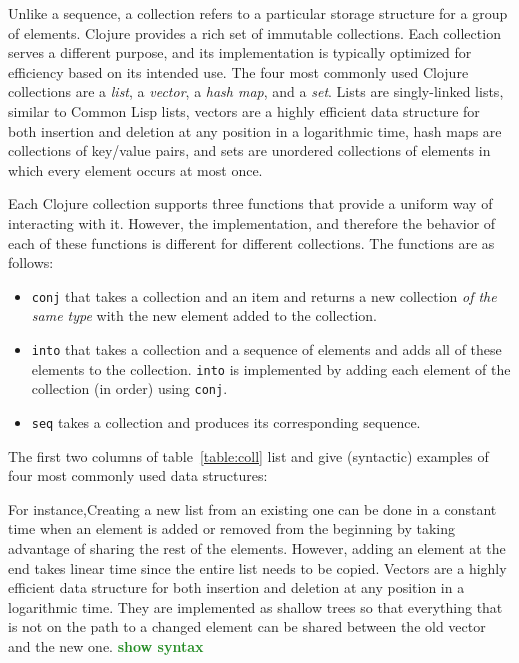 \documentclass[submission,copyright,creativecommons]{eptcs}
\newcommand{\allcomments}[1]{{#1}}
\newcommand{\elenacomment}[1]{{\bf \textcolor{ForestGreen}{\allcomments{{#1}}}}}
\newcommand{\clocode}[1]{{\tt {#1}}}
\begin{document}
Unlike a sequence, a collection refers to a particular storage structure for a group of elements. Clojure provides a rich set of immutable collections. Each collection serves a different purpose, and its  implementation  is typically optimized for efficiency based on its intended use. The four most commonly used Clojure collections are a {\it list}, a {\it vector}, a {\it hash map}, and a {\it set}. Lists are singly-linked lists, similar to Common Lisp lists, vectors are a highly efficient data structure for both insertion and deletion at any position in a logarithmic time, hash maps are collections of key/value pairs, and sets are unordered collections of elements in which every element occurs at most once. 

Each Clojure collection supports three functions that provide a uniform way of interacting with it. However, the implementation, and therefore the behavior of each of these functions is different for different collections. The functions are as follows:
\begin{itemize}
\item \clocode{conj} that takes a collection and an item and returns a new collection {\it of the same type} with the new element added to the collection. 
\item \clocode{into} that takes a collection and a sequence of elements and adds all of these elements to the collection. \clocode{into} is implemented by adding each element of the collection (in order) using \clocode{conj}. 
\item \clocode{seq} takes a collection and produces its corresponding sequence. 
\end{itemize}

The first two columns of table~\ref{table:coll} list and give (syntactic) examples of four most commonly used data structures:


For instance,Creating a new list from an existing one can be done in a constant time when an element is added or removed from the beginning by taking advantage of sharing the rest of the elements. %
However, adding an element at the end takes linear time since the entire list needs to be copied. 
Vectors are a highly efficient data structure for both insertion and deletion at any position in a logarithmic time.
They are implemented as shallow trees so that everything that is not on the path to a changed element can be shared between the old vector and the new one.
\elenacomment{show syntax}
\end{document}
